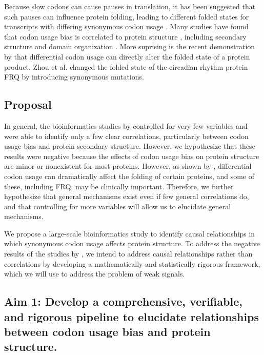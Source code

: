 \documentclass[11pt]{nih}
\begin{document}
Because slow codons can cause pauses in translation, it has been suggested that such pauses can influence protein folding, leading to different folded states for transcripts with differing synonymous codon usage \cite{Komar2009,Zhang2009,Buchan2007}.
Many studies have found that codon usage bias is correlated to protein structure \citep{Saunders2010,Biro2006,Adzhubei1996,Gu2003}, including secondary structure \citep{Oresic2003,Gu2003} and domain organization \citep{Gu2004,Oresic2003}. More suprising is the recent demonstration by \citet{Zhou2013} that differential codon usage can directly alter the folded state of a protein product. Zhou et al. changed the folded state of the circadian rhythm protein FRQ by introducing synonymous mutations.

\subsection{Proposal}

In general, the bioinformatics studies by \citet{Saunders2010,Biro2006,Adzhubei1996,Gu2003} controlled for very few variables and were able to identify only a few clear correlations, particularly between codon usage bias and protein secondary structure. However, we hypothesize that these results were negative because the effects of codon usage bias on protein structure are minor or nonexistent for most proteins. However, as shown by \citet{Zhou2013}, differential codon usage can dramatically affect the folding of certain proteins, and some of these, including FRQ, may be clinically important. Therefore, we further hypothesize that general mechanisms exist even if few general correlations do, and that controlling for more variables will allow us to elucidate general mechanisms.

We propose a large-scale bioinformatics study to identify causal relationships in which synonymous codon usage affects protein structure. To address the negative results of the studies by \citet{Saunders2010,Biro2006,Adzhubei1996,Gu2003}, we intend to address causal relationships rather than correlations by developing a mathematically and statistically rigorous framework, which we will use to address the problem of weak signals.

\subsection{Aim 1: Develop a comprehensive, verifiable, and rigorous pipeline to elucidate relationships between codon usage bias and protein structure.}
\end{document}
